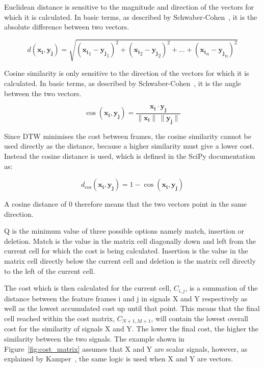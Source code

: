 Euclidean distance is sensitive to the magnitude and direction of the vectors for which 
it is calculated. In basic terms, as described by Schwaber-Cohen~\cite{vector_sim}, it is the absolute difference between two vectors.

\begin{equation}
    d(\mathbf{x_i}, \mathbf{y_j}) = \sqrt{(\mathbf{x_i}_1 - \mathbf{y_j}_1)^2 + (\mathbf{x_i}_2 - \mathbf{y_j}_2)^2 + \dots + (\mathbf{x_i}_n - \mathbf{y_j}_n)^2}
    \label{eq:euclidean} 
\end{equation}

Cosine similarity is only sensitive to the direction of the vectors for which it is calculated. 
In basic terms, as described by Schwaber-Cohen~\cite{vector_sim}, it is the angle between the two vectors.

\begin{equation}
    \cos(\mathbf{x_i}, \mathbf{y_j}) = \frac{\mathbf{x_i} \cdot \mathbf{y_j}}{\lVert\mathbf{x_i}\rVert \, \lVert\mathbf{y_j}\rVert}
    \label{eq:cosine} 
\end{equation}

Since \acs{DTW} minimises the cost between frames, the cosine similarity cannot be used directly as the distance, 
because a higher similarity must give a lower cost. Instead the cosine distance is used, which is defined in 
the SciPy documentation~\cite{scipy_dist} as:

\begin{equation}
    d_{\cos}(\mathbf{x_i}, \mathbf{y_j}) = 1 - \cos(\mathbf{x_i}, \mathbf{y_j})
    \label{eq:cosine_distance} 
\end{equation}

A cosine distance of 0 therefore means that the two vectors point in the same direction.

Q is the minimum value of three possible options namely match, insertion or deletion. 
Match is the value in the matrix cell diagonally down and left from the current cell for 
which the cost is being calculated. Insertion is the value in the matrix cell directly below 
the current cell and deletion is the matrix cell directly to the left of the current cell.

The cost which is then calculated for the current cell, $C_{i, j}$, is a summation of the distance 
between the feature frames i and j in signals X and Y respectively as well as the lowest 
accumulated cost up until that point. This means that the final cell reached within the 
cost matrix, $C_{N+1, M+1}$, will contain the lowest overall cost for the similarity of signals X 
and Y. The lower the final cost, the higher the similarity between the two signals. The 
example shown in Figure~\ref{fig:cost_matrix} assumes that X and Y are scalar signals, however, as 
explained by Kamper~\cite{dtw_kamper}, the same logic is used when X and Y are vectors.

